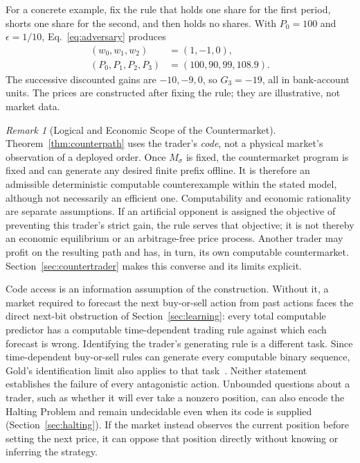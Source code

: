 \documentclass[aps,pra,reprint,superscriptaddress,amsmath,amssymb,floatfix]{revtex4-2}
\theoremstyle{plain}
\theoremstyle{definition}
\theoremstyle{remark}
\newtheorem{remark}{Remark}
\begin{document}
For a concrete example, fix the rule that holds one share for the first
period, shorts one share for the second, and then holds no shares. With
\(P_0=100\) and \(\epsilon=1/10\), Eq.~\eqref{eq:adversary} produces
\begin{align*}
  (w_0,w_1,w_2)&=(1,-1,0),\\
  (P_0,P_1,P_2,P_3)&=(100,90,99,108.9).
\end{align*}
The successive discounted gains are \(-10,-9,0\), so \(G_3=-19\), all in
bank-account units. The prices are constructed after fixing the rule; they
are illustrative, not market data.

\begin{remark}[Logical and Economic Scope of the Countermarket]
\label{rem:counterpath-scope}
Theorem~\ref{thm:counterpath} uses the trader's \emph{code}, not a physical
market's observation of a deployed order. Once \(M_\sigma\) is fixed, the
countermarket program is fixed and can generate any desired finite prefix
offline. It is therefore an admissible deterministic computable counterexample
within the stated model, although not necessarily an efficient one.
Computability and economic rationality are separate assumptions. If an
artificial opponent is assigned the objective of preventing this trader's
strict gain, the rule serves that objective; it is not thereby an economic
equilibrium or an arbitrage-free price process. Another trader may profit
on the resulting path and has, in turn, its own computable countermarket.
Section~\ref{sec:countertrader} makes this converse and its limits explicit.

Code access is an information assumption of the construction. Without it, a
market required to forecast the next buy-or-sell action from past actions
faces the direct next-bit obstruction of Section~\ref{sec:learning}: every
total computable predictor has a computable time-dependent trading rule
against which each forecast is wrong. Identifying the trader's generating
rule is a different task. Since time-dependent buy-or-sell rules can generate
every computable binary sequence, Gold's identification limit also applies
to that task~\cite{go-65,go-67}. Neither statement establishes the failure of
every antagonistic action. Unbounded questions about a trader, such as
whether it will ever take a nonzero position, can also encode the Halting
Problem and remain undecidable even when its code is supplied
(Section~\ref{sec:halting}). If the market instead observes the current
position before setting the next price, it can oppose that position directly
without knowing or inferring the strategy.
\end{remark}
\end{document}
